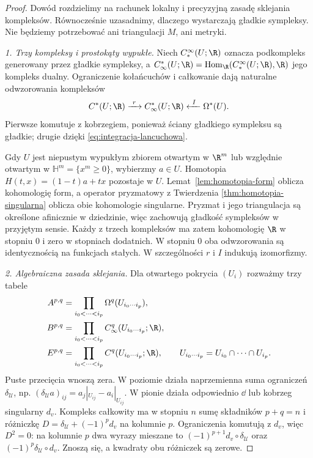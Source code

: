 \begin{proof}
Dowód rozdzielimy na rachunek lokalny i precyzyjną
zasadę sklejania kompleksów. Równocześnie uzasadnimy,
dlaczego wystarczają gładkie sympleksy. Nie będziemy
potrzebować ani triangulacji $M$, ani metryki.

\emph{1. Trzy kompleksy i prostokąty wypukłe.}
Niech $C_*^\infty(U;\R)$ oznacza podkompleks
generowany przez gładkie sympleksy, a
$C_\infty^*(U;\R)=\operatorname{Hom}_{\R}
(C_*^\infty(U;\R),\R)$ jego kompleks dualny.
Ograniczenie kołańcuchów i całkowanie dają naturalne
odwzorowania kompleksów
\[
 C^*(U;\R)\xrightarrow{\ r\ }C_\infty^*(U;\R)
 \xleftarrow{\ I\ }\Omega^*(U).
\]
Pierwsze komutuje z kobrzegiem, ponieważ ściany
gładkiego sympleksu są gładkie; drugie dzięki
\eqref{eq:integracja-lancuchowa}.

Gdy $U$ jest niepustym wypukłym zbiorem otwartym
w $\R^m$ lub względnie otwartym w
$\mathbb H^m=\{x^m\geq0\}$, wybierzmy $a\in U$.
Homotopia $H(t,x)=(1-t)a+tx$ pozostaje w $U$.
Lemat~\ref{lem:homotopia-form} oblicza kohomologię
form, a operator pryzmatowy z Twierdzenia
\ref{thm:homotopia-singularna} oblicza obie kohomologie
singularne. Pryzmat i jego triangulacja są określone
afinicznie w dziedzinie, więc zachowują gładkość
sympleksów w przyjętym sensie. Każdy z trzech
kompleksów ma zatem kohomologię $\R$ w stopniu $0$
i zero w stopniach dodatnich. W stopniu $0$ oba
odwzorowania są identycznością na funkcjach stałych.
W szczególności $r$ i $I$ indukują izomorfizmy.

\emph{2. Algebraiczna zasada sklejania.}
Dla otwartego pokrycia $(U_i)$ rozważmy trzy tabele
\[
 \begin{aligned}
 A^{p,q}&=\prod_{i_0<\cdots<i_p}\Omega^q(U_{i_0\cdots i_p}),\\
 B^{p,q}&=\prod_{i_0<\cdots<i_p}C_\infty^q(U_{i_0\cdots i_p};\R),\\
 E^{p,q}&=\prod_{i_0<\cdots<i_p}C^q(U_{i_0\cdots i_p};\R),
 \qquad U_{i_0\cdots i_p}=U_{i_0}\cap\cdots\cap U_{i_p}.
 \end{aligned}
\]
Puste przecięcia wnoszą zera. W poziomie działa
naprzemienna suma ograniczeń $\delta_{\mathcal U}$,
np. $(\delta_{\mathcal U}a)_{ij}=a_j|_{U_{ij}}-a_i|_{U_{ij}}$.
W pionie działa odpowiednio $\dd$ lub kobrzeg singularny
$d_v$. Kompleks całkowity ma w stopniu $n$ sumę
składników $p+q=n$ i różniczkę
$D=\delta_{\mathcal U}+(-1)^p d_v$ na kolumnie $p$.
Ograniczenia komutują z $d_v$, więc $D^2=0$:
na kolumnie $p$ dwa wyrazy mieszane to
$(-1)^{p+1}d_v\circ\delta_{\mathcal U}$ oraz
$(-1)^p\delta_{\mathcal U}\circ d_v$.
Znoszą się, a kwadraty obu różniczek są zerowe.


\end{proof}
